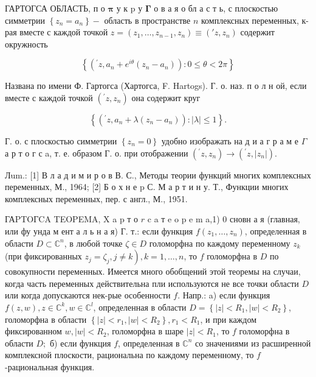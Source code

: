 \documentclass[10pt]{article}
\begin{document}
ГАРТОГСА ОБЛАСТЬ, $п$ о $\boldsymbol{\pi}$ у к $\mathrm{p}$ у $\boldsymbol{\Gamma}$ о в а я о бл а с т ь, с плоскостью симметрии $\left\{z_{n}=a_{n}\right\}-$ область в пространстве $n$ комплексных переменных, к-рая вместе с каждой точкой $z=\left(z_{1}, \ldots, z_{n-1}, z_{n}\right) \equiv\left(' z, z_{n}\right)$ содержит окружность



\[

\left\{\left({ }^{\prime} z, a_{n}+e^{i \theta}\left(z_{n}-a_{n}\right)\right): 0 \leqslant \theta<2 \pi\right\}

\]



Названа по имени Ф. Гартогса (Хартогса, F. Hartogs). Г. о. наз. п о л н ой, если вместе с каждой точкой $\left({ }^{\prime} z, z_{n}\right)$ она содержит круг



\[

\left\{\left({ }^{\prime} z, a_{n}+\lambda\left(z_{n}-a_{n}\right)\right):|\lambda| \leqslant 1\right\} .

\]



Г. о. с плоскостью симметрии $\left\{z_{n}=0\right\}$ удобно изображать на д и а г р а м е $\Gamma$ а р т о г с a, т. е. образом Г. о. при отображении $\left({ }^{\prime} z, z_{n}\right) \rightarrow\left({ }^{\prime} z,\left|z_{n}\right|\right)$.



Лum.: [1] В л а д и м и р о в В. С., Методы теории функций многих комплексных переменных, М., 1964; [2] Б о х н е p С. М а р т и н у. Т., Функции многих комплексных переменных, пер. с англ., М., 1951.



ГАPTOГCA TEOPEMA, X a p т о $r$ c a т e o p e m a,1) 0 сновн а я (главная, или фу унда м ент а л ь н а я) Г. т.: если функция $f\left(z_{1}, \ldots, z_{n}\right)$, определенная в области $D \subset \mathbb{C}^{n}$, в любой точке $\zeta \in D$ голоморфна по каждому переменному $z_{k}$ (при фиксированных $\left.z_{j}=\zeta_{j}, j \neq k\right), k=1, \ldots, n$, то $f$ голоморфна в $D$ по совокупности переменных. Имеется много обобщений этой теоремы на случаи, когда часть переменных действительна пли используются не все точки области $D$ или когда допускаются нек-рые особенности $f$. Напр.: a) если функция $f(z, w), z \in \mathbb{C}^{k}, w \in \mathbb{C}^{l}$, определенная в области $D=\left\{|z|<R_{1},|w|<R_{2}\right\}$, голоморфна в области $\left\{|z|<r_{1},|w|<R_{2}\right\}, r_{1}<R_{1}$, и при каждом фиксированном $w,|w|<R_{2}$, голоморфна в шаре $|z|<R_{1}$, то $f$ голоморфна в области $D ;$ б) если функция $f$, определенная в $\mathbb{C}^{n}$ со значениями из расширенной комплексной плоскости, рациональна по каждому переменному, то $f$-рациональная функция.
\end{document}
